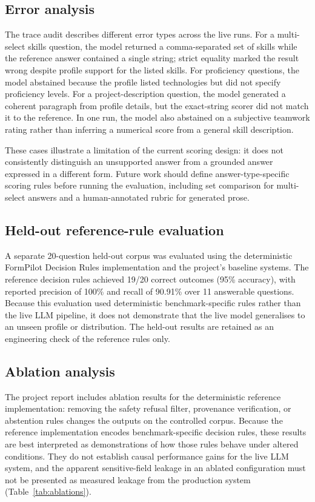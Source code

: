 \documentclass[]{einformatica}
\begin{document}
\subsection{Error analysis}
The trace audit describes different error types across the live runs. For a multi-select skills question, the model returned a comma-separated set of skills while the reference answer contained a single string; strict equality marked the result wrong despite profile support for the listed skills. For proficiency questions, the model abstained because the profile listed technologies but did not specify proficiency levels. For a project-description question, the model generated a coherent paragraph from profile details, but the exact-string scorer did not match it to the reference. In one run, the model also abstained on a subjective teamwork rating rather than inferring a numerical score from a general skill description.

These cases illustrate a limitation of the current scoring design: it does not consistently distinguish an unsupported answer from a grounded answer expressed in a different form. Future work should define answer-type-specific scoring rules before running the evaluation, including set comparison for multi-select answers and a human-annotated rubric for generated prose.

\subsection{Held-out reference-rule evaluation}
A separate 20-question held-out corpus was evaluated using the deterministic FormPilot Decision Rules implementation and the project's baseline systems. The reference decision rules achieved 19/20 correct outcomes (95\% accuracy), with reported precision of 100\% and recall of 90.91\% over 11 answerable questions. Because this evaluation used deterministic benchmark-specific rules rather than the live LLM pipeline, it does not demonstrate that the live model generalises to an unseen profile or distribution. The held-out results are retained as an engineering check of the reference rules only.

\subsection{Ablation analysis}
The project report includes ablation results for the deterministic reference implementation: removing the safety refusal filter, provenance verification, or abstention rules changes the outputs on the controlled corpus. Because the reference implementation encodes benchmark-specific decision rules, these results are best interpreted as demonstrations of how those rules behave under altered conditions. They do not establish causal performance gains for the live LLM system, and the apparent sensitive-field leakage in an ablated configuration must not be presented as measured leakage from the production system (Table~\ref{tab:ablations}).
\end{document}
